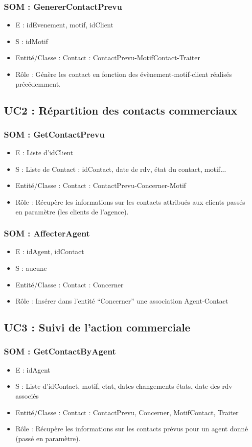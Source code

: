 \subsubsection{SOM : GenererContactPrevu}
\begin{itemize}
\item E : idEvenement, motif, idClient
\item S : idMotif
\item Entité/Classe : Contact : ContactPrevu-MotifContact-Traiter
\item Rôle : Génère les contact en fonction des évènement-motif-client réalisés
précédemment.
\end{itemize}
\subsection{UC2 : Répartition des contacts commerciaux}
\subsubsection{SOM : GetContactPrevu}
\begin{itemize}
\item E : Liste d’idClient
\item S : Liste de Contact : idContact, date de rdv, état du contact, motif...
\item Entité/Classe : Contact : ContactPrevu-Concerner-Motif
\item Rôle : Récupère les informations sur les contacts attribués aux clients passés en
paramètre (les clients de l’agence).
\end{itemize}
\subsubsection{SOM : AffecterAgent}
\begin{itemize}
\item E : idAgent, idContact
\item S : aucune
\item Entité/Classe : Contact : Concerner
\item Rôle : Insérer dans l’entité “Concerner” une association Agent-Contact
\end{itemize}
\subsection{UC3 : Suivi de l’action commerciale}
\subsubsection{SOM : GetContactByAgent}
\begin{itemize}
\item E : idAgent
\item S : Liste d’idContact, motif, etat, dates changements états, date des rdv associés
\item Entité/Classe : Contact : ContactPrevu, Concerner, MotifContact, Traiter
\item Rôle : Récupère les informations sur les contacts prévus pour un agent donné
(passé en paramètre).
\end{itemize}
